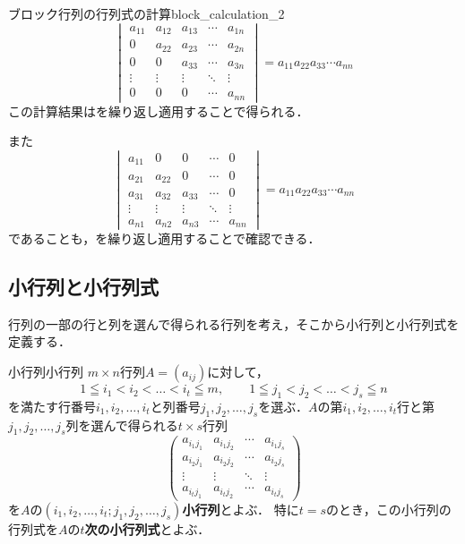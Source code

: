 \begin{example}{ブロック行列の行列式の計算}{block_calculation_2}
  \[
  \begin{vmatrix} 
    a_{11} & a_{12} & a_{13} & \cdots & a_{1n} \\
    0      & a_{22} & a_{23} & \cdots & a_{2n} \\
    0      & 0      & a_{33} & \cdots & a_{3n} \\
    \vdots & \vdots & \vdots & \ddots & \vdots \\
    0      & 0      & 0      & \cdots & a_{nn}
  \end{vmatrix}
  =
  a_{11}a_{22}a_{33}\cdots a_{nn}
  \]
  この計算結果はを繰り返し適用することで得られる．

  また
  \[
  \begin{vmatrix}
  a_{11} & 0     & 0      & \cdots & 0      \\
  a_{21} & a_{22} & 0      & \cdots & 0      \\
  a_{31} & a_{32} & a_{33} & \cdots & 0      \\
  \vdots & \vdots & \vdots & \ddots & \vdots \\
  a_{n1} & a_{n2} & a_{n3} & \cdots & a_{nn}
  \end{vmatrix}
  = a_{11}a_{22}a_{33}\cdots a_{nn}
  \]
  であることも，を繰り返し適用することで確認できる．
\end{example}

\subsection{小行列と小行列式}

行列の一部の行と列を選んで得られる行列を考え，そこから小行列と小行列式を定義する．


\begin{definition}{小行列}{小行列}
  $m \times n$行列$A=(a_{ij})$に対して，
  \[
  1 \leqq i_1 < i_2 < \dots < i_t \leqq m,
  \qquad
  1 \leqq j_1 < j_2 < \dots < j_s \leqq n
  \]
  を満たす行番号$i_1,i_2,\dots,i_t$と列番号$j_1,j_2,\dots,j_s$を選ぶ．$A$の第$i_1,i_2,\dots,i_t$行と第$j_1,j_2,\dots,j_s$列を選んで得られる$t \times s$行列
  \[
  \begin{pmatrix}
  a_{i_1 j_1} & a_{i_1 j_2} & \cdots & a_{i_1 j_s} \\
  a_{i_2 j_1} & a_{i_2 j_2} & \cdots & a_{i_2 j_s} \\
  \vdots      & \vdots      & \ddots & \vdots      \\
  a_{i_t j_1} & a_{i_t j_2} & \cdots & a_{i_t j_s}
  \end{pmatrix}
  \]
  を$A$の\textbf{$(i_1,i_2,\dots,i_t ; j_1,j_2,\dots,j_s)$小行列}とよぶ．
  特に$t=s$のとき，この小行列の行列式を$A$の\textbf{$t$次の小行列式}とよぶ．
\end{definition}

